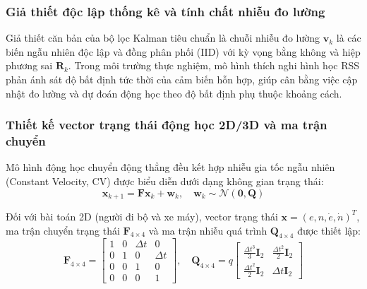 \subsubsection{Giả thiết độc lập thống kê và tính chất nhiễu đo lường}

\hspace{0.5cm} Giả thiết căn bản của bộ lọc Kalman tiêu chuẩn là chuỗi nhiễu đo lường $\mathbf{v}_k$ là các biến ngẫu nhiên độc lập và đồng phân phối (IID) với kỳ vọng bằng không và hiệp phương sai $\mathbf{R}_k$. Trong môi trường thực nghiệm, mô hình thích nghi hình học RSS phản ánh sát độ bất định tức thời của cảm biến hỗn hợp, giúp cân bằng việc cập nhật đo lường và dự đoán động học theo độ bất định phụ thuộc khoảng cách.


\subsubsection{Thiết kế vector trạng thái động học 2D/3D và ma trận chuyển}

\hspace{0.5cm} Mô hình động học chuyển động thẳng đều kết hợp nhiễu gia tốc ngẫu nhiên (Constant Velocity, CV) được biểu diễn dưới dạng không gian trạng thái:
\begin{equation}
\mathbf{x}_{k+1} = \mathbf{F} \mathbf{x}_k + \mathbf{w}_k, \quad \mathbf{w}_k \sim \mathcal{N}(\mathbf{0}, \mathbf{Q})
\label{eq:state-space-model}
\end{equation}

Đối với bài toán 2D (người đi bộ và xe máy), vector trạng thái $\mathbf{x} = (e, n, \dot{e}, \dot{n})^T$, ma trận chuyển trạng thái $\mathbf{F}_{4 \times 4}$ và ma trận nhiễu quá trình $\mathbf{Q}_{4 \times 4}$ được thiết lập:
\begin{equation}
\mathbf{F}_{4 \times 4} = \begin{bmatrix} 1 & 0 & \Delta t & 0 \\ 0 & 1 & 0 & \Delta t \\ 0 & 0 & 1 & 0 \\ 0 & 0 & 0 & 1 \end{bmatrix}, \quad \mathbf{Q}_{4 \times 4} = q \begin{bmatrix} \frac{\Delta t^3}{3}\mathbf{I}_2 & \frac{\Delta t^2}{2}\mathbf{I}_2 \\ \frac{\Delta t^2}{2}\mathbf{I}_2 & \Delta t\mathbf{I}_2 \end{bmatrix}
\label{eq:f-and-q-matrices-2d}
\end{equation}

